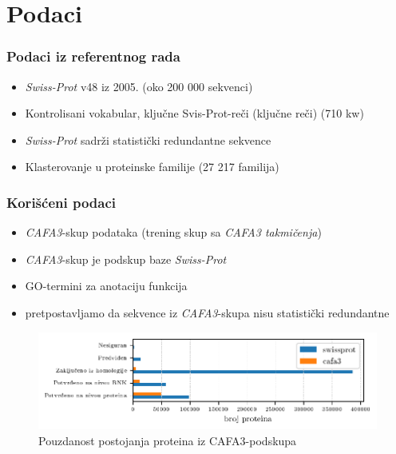 \documentclass{beamer}
\newcommand{\swissprot}{\textit{Swiss-Prot} }
\begin{document}
\section{Podaci}


\begin{frame}
  \frametitle{Podaci iz referentnog rada}

  \begin{itemize}
    \item \swissprot v48 iz 2005. (oko 200 000 sekvenci)
    \item Kontrolisani vokabular, ključne Svis-Prot-reči (ključne reči) (710 kw)
    \item \swissprot sadrži statistički redundantne sekvence
    \item Klasterovanje u proteinske familije (27 217 familija)
  \end{itemize}

\end{frame}

\begin{frame}
  \frametitle{Korišćeni podaci}

  \begin{itemize}
    \item \textit{CAFA3}-skup podataka (trening skup sa \textit{CAFA3 takmičenja})
    \item \textit{CAFA3}-skup je podskup baze \swissprot
    \item GO-termini za anotaciju funkcija
    \item pretpostavljamo da sekvence iz \textit{CAFA3}-skupa nisu statistički
          redundantne
  \end{itemize}

  \begin{figure}
    \centering 
    \hspace*{-0.5cm} 
    \includegraphics[scale=0.8]{plots/cafa3_pe}
    \vspace*{-0.5cm} 
    \caption{Pouzdanost postojanja proteina iz CAFA3-podskupa }
  \end{figure}
\end{frame}
\end{document}
